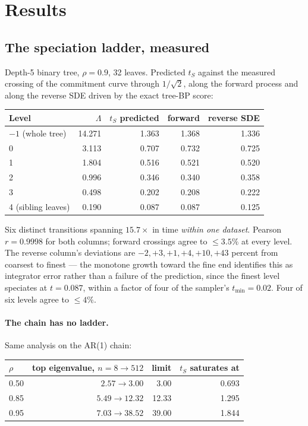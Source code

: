 \documentclass[11pt]{article}
\theoremstyle{remark}
\begin{document}
\section{Results}
\label{sec:results}

\subsection{The speciation ladder, measured}
\label{sec:cascade}

Depth-5 binary tree, $\rho = 0.9$, 32 leaves. Predicted $t_S$ against the
measured crossing of the commitment curve through $1/\sqrt2$, along the forward
process and along the reverse SDE driven by the exact tree-BP score:

\begin{center}
\begin{tabular}{@{}lrrrr@{}}
\toprule
Level & $\Lambda$ & $t_S$ predicted & forward & reverse SDE \\
\midrule
$-1$ (whole tree) & 14.271 & 1.363 & 1.368 & 1.336 \\
0 & 3.113 & 0.707 & 0.732 & 0.725 \\
1 & 1.804 & 0.516 & 0.521 & 0.520 \\
2 & 0.996 & 0.346 & 0.340 & 0.358 \\
3 & 0.498 & 0.202 & 0.208 & 0.222 \\
4 (sibling leaves) & 0.190 & 0.087 & 0.087 & 0.125 \\
\bottomrule
\end{tabular}
\end{center}

Six distinct transitions spanning $15.7\times$ in time \emph{within one
dataset}. Pearson $r = 0.9998$ for both columns; forward crossings agree to
$\leq 3.5\%$ at every level. The reverse column's deviations are
$-2, +3, +1, +4, +10, +43$ percent from coarsest to finest --- the monotone
growth toward the fine end identifies this as integrator error rather than a
failure of the prediction, since the finest level speciates at $t=0.087$, within
a factor of four of the sampler's $t_{\min} = 0.02$. Four of six levels agree to
$\leq 4\%$.

\paragraph{The chain has no ladder.} Same analysis on the AR(1) chain:

\begin{center}
\begin{tabular}{@{}lrrr@{}}
\toprule
$\rho$ & top eigenvalue, $n = 8 \to 512$ & limit & $t_S$ saturates at \\
\midrule
0.50 & $2.57 \to 3.00$ & 3.00 & 0.693 \\
0.85 & $5.49 \to 12.32$ & 12.33 & 1.295 \\
0.95 & $7.03 \to 38.52$ & 39.00 & 1.844 \\
\bottomrule
\end{tabular}
\end{center}
\end{document}
